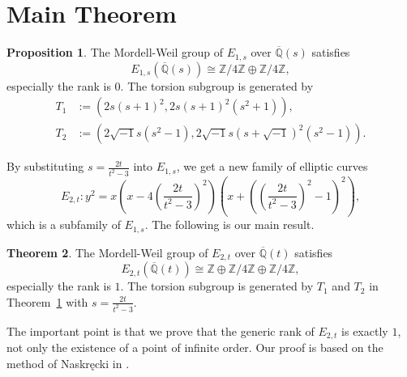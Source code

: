 \documentclass[a4paper]{jarticle} %
\theoremstyle{definition}
\newtheorem{thm}{Theorem}[section]
\newtheorem{prop}[thm]{Proposition}
\theoremstyle{remark}
\begin{document}
\section{Main Theorem}

\begin{prop}
    \label{thm:E_{1,s}}
    The Mordell-Weil group of $E_{1,s}$ over $\overline{\mathbb{Q}}(s)$ satisfies
    \begin{equation*}
        E_{1,s}(\overline{\mathbb{Q}}(s)) \cong \mathbb{Z} / 4 \mathbb{Z} \oplus \mathbb{Z} / 4 \mathbb{Z},
    \end{equation*}
    especially the rank is $0$.
    The torsion subgroup is generated by
    \begin{align*}
        T_1 & := (2s(s+1)^2, 2s(s+1)^2(s^2+1)),                               \\
        T_2 & := (2 \sqrt{-1} s(s^2-1),2 \sqrt{-1} s(s+\sqrt{-1})^2(s^2-1)).
    \end{align*}
\end{prop}
\vspace{1em}

By substituting $s = \frac{2t}{t^{2} - 3}$ into $E_{1,s}$, we get a new family of elliptic curves
\begin{equation*}
    E_{2,t}: y^{2} = x \left(x - 4 \left(\frac{2t}{t^{2} - 3} \right)^{2} \right) \left(x + \left(\left(\frac{2t}{t^{2} - 3} \right)^{2} - 1 \right)^{2} \right),
\end{equation*}
which is a subfamily of $E_{1,s}$.
The following is our main result.
\begin{thm}
    \label{thm:E_{2,t}}
    The Mordell-Weil group of $E_{2,t}$ over $\overline{\mathbb{Q}}(t)$ satisfies
    \begin{equation*}
        E_{2,t}(\overline{\mathbb{Q}}(t)) \cong \mathbb{Z} \oplus \mathbb{Z} / 4 \mathbb{Z} \oplus \mathbb{Z} / 4 \mathbb{Z},
    \end{equation*}
    especially the rank is $1$.
    The torsion subgroup is generated by $T_1$ and $T_2$ in Theorem~\ref{thm:E_{1,s}} with $s = \frac{2t}{t^{2} - 3}$.
\end{thm}
The important point is that we prove that the generic rank of $E_{2,t}$ is exactly $1$, not only the existence of a point of infinite order.
Our proof is based on the method of Naskręcki in \cite{ref:naskrecki2013}.
\end{document}
